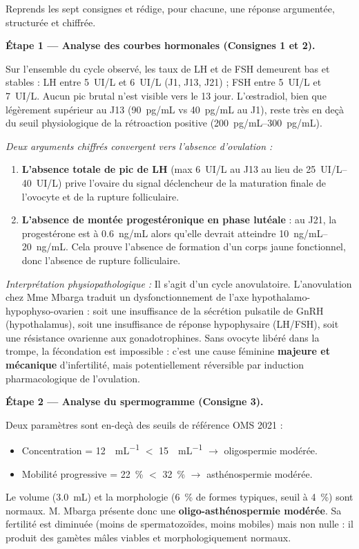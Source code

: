 \documentclass[11pt]{article}
\newcommand{\cle}[1]{{\popxbold\color{popdark}#1}}
\begin{document}
\begin{exoresolu}
Reprends les sept consignes et rédige, pour chacune, une réponse argumentée, structurée et chiffrée.
\tcblower

\textbf{Étape 1 — Analyse des courbes hormonales (Consignes 1 et 2).}

Sur l'ensemble du cycle observé, les taux de LH et de FSH demeurent bas et stables : LH entre \SI{5}{UI/L} et \SI{6}{UI/L} (J1, J13, J21) ; FSH entre \SI{5}{UI/L} et \SI{7}{UI/L}. Aucun pic brutal n'est visible vers le 13\ieme{} jour. L'{\oe}stradiol, bien que légèrement supérieur au J13 (\SI{90}{pg/mL} vs \SI{40}{pg/mL} au J1), reste très en deçà du seuil physiologique de la rétroaction positive (\SIrange{200}{300}{pg/mL}). 

\emph{Deux arguments chiffrés convergent vers l'absence d'ovulation :}
\begin{enumerate}
\item \textbf{L'absence totale de pic de LH} (max \SI{6}{UI/L} au J13 au lieu de \SIrange{25}{40}{UI/L}) prive l'ovaire du signal déclencheur de la maturation finale de l'ovocyte et de la rupture folliculaire.
\item \textbf{L'absence de montée progestéronique en phase lutéale} : au J21, la progestérone est à \SI{0,6}{ng/mL} alors qu'elle devrait atteindre \SIrange{10}{20}{ng/mL}. Cela prouve l'absence de formation d'un corps jaune fonctionnel, donc l'absence de rupture folliculaire.
\end{enumerate}

\emph{Interprétation physiopathologique :} Il s'agit d'un cycle \cle{anovulatoire}. L'anovulation chez Mme Mbarga traduit un dysfonctionnement de l'axe hypothalamo-hypophyso-ovarien : soit une insuffisance de la sécrétion pulsatile de GnRH (hypothalamus), soit une insuffisance de réponse hypophysaire (LH/FSH), soit une résistance ovarienne aux gonadotrophines. Sans ovocyte libéré dans la trompe, la fécondation est impossible : c'est une cause féminine \textbf{majeure et mécanique} d'infertilité, mais potentiellement réversible par induction pharmacologique de l'ovulation.

\textbf{Étape 2 — Analyse du spermogramme (Consigne 3).}

Deux paramètres sont en-deçà des seuils de référence OMS 2021 :
\begin{itemize}
\item Concentration = \SI{12}{\million\per\mL} $<$ \SI{15}{\million\per\mL} $\rightarrow$ \cle{oligospermie} modérée.
\item Mobilité progressive = \SI{22}{\%} $<$ \SI{32}{\%} $\rightarrow$ \cle{asthénospermie} modérée.
\end{itemize}
Le volume (\SI{3,0}{mL}) et la morphologie (\SI{6}{\%} de formes typiques, seuil à \SI{4}{\%}) sont normaux. M. Mbarga présente donc une \textbf{oligo-asthénospermie modérée}. Sa fertilité est diminuée (moins de spermatozoïdes, moins mobiles) mais non nulle : il produit des gamètes mâles viables et morphologiquement normaux.


\end{exoresolu}
\end{document}
